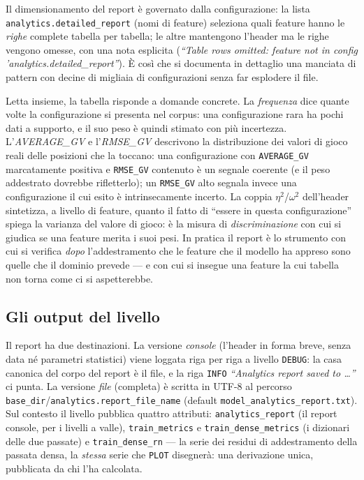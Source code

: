 Il dimensionamento del report è governato dalla configurazione: la lista
\texttt{analytics.detailed\_report} (nomi di feature) seleziona quali
feature hanno le \emph{righe} complete tabella per tabella; le altre
mantengono l'header ma le righe vengono omesse, con una nota esplicita
(\emph{``Table rows omitted: feature not in config
'analytics.detailed\_report''}). È così che si documenta in dettaglio una
manciata di pattern con decine di migliaia di configurazioni senza far
esplodere il file.

Letta insieme, la tabella risponde a domande concrete. La \emph{frequenza}
dice quante volte la configurazione si presenta nel corpus: una
configurazione rara ha pochi dati a supporto, e il suo peso è quindi
stimato con più incertezza. L'\emph{AVERAGE\_GV} e l'\emph{RMSE\_GV}
descrivono la distribuzione dei valori di gioco reali delle posizioni che la
toccano: una configurazione con \texttt{AVERAGE\_GV} marcatamente positiva
e \texttt{RMSE\_GV} contenuto è un segnale coerente (e il peso addestrato
dovrebbe rifletterlo); un \texttt{RMSE\_GV} alto segnala invece una
configurazione il cui esito è intrinsecamente incerto. La coppia
$\eta^{2}$/$\omega^{2}$ dell'header sintetizza, a livello di feature, quanto
il fatto di ``essere in questa configurazione'' spiega la varianza del
valore di gioco: è la misura di \emph{discriminazione} con cui si giudica se
una feature merita i suoi pesi. In pratica il report è lo strumento con cui
si verifica \emph{dopo} l'addestramento che le feature che il modello ha
appreso sono quelle che il dominio prevede — e con cui si insegue una
feature la cui tabella non torna come ci si aspetterebbe.

\subsection{Gli output del livello}

Il report ha due destinazioni. La versione \emph{console} (l'header in forma
breve, senza data né parametri statistici) viene loggata riga per riga a
livello \texttt{DEBUG}: la casa canonica del corpo del report è il file, e
la riga \texttt{INFO} \emph{``Analytics report saved to \ldots''} ci
punta. La versione \emph{file} (completa) è scritta in UTF-8 al percorso
\texttt{base\_dir}/\texttt{analytics.report\_file\_name} (default
\texttt{model\_analytics\_report.txt}). Sul contesto il livello pubblica
quattro attributi: \texttt{analytics\_report} (il report console, per i
livelli a valle), \texttt{train\_metrics} e
\texttt{train\_dense\_metrics} (i dizionari delle due passate) e
\texttt{train\_dense\_rn} — la serie dei residui di addestramento della
passata densa, la \emph{stessa} serie che \texttt{PLOT} disegnerà: una
derivazione unica, pubblicata da chi l'ha calcolata.


